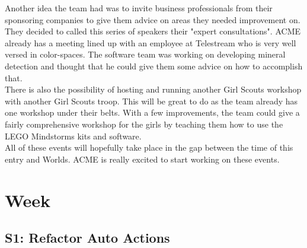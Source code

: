 \documentclass{article}
\begin{document}
Another idea the team had was to invite business professionals from their sponsoring companies to give them advice on areas they needed improvement on. They decided to called this series of speakers their "expert consultations". ACME already has a meeting lined up with an employee at Telestream who is very well versed in color-spaces. The software team was working on developing mineral detection and thought that he could give them some advice on how to accomplish that. \\

There is also the possibility of hosting and running another Girl Scouts workshop with another Girl Scouts troop. This will be great to do as the team already has one workshop under their belts. With a few improvements, the team could give a fairly comprehensive workshop for the girls by teaching them how to use the LEGO Mindstorms kits and software. \\

All of these events will hopefully take place in the gap between the time of this entry and Worlds. ACME is really excited to start working on these events. \\
\clearpage \newpage \section{Week \thesection} 
\subsection{S1: Refactor Auto Actions}
\end{document}
